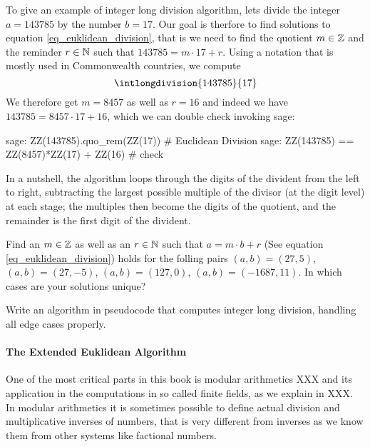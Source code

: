 \begin{example} To give an example of integer long division algorithm, lets divide the integer $a=143785$ by the number $b=17$. Our goal is therfore to find solutions to equation \ref{eq_euklidean_division}, that is we need to find the quotient $m\in\mathbb{Z}$ and the reminder $r \in \mathbb{N}$ such that $143785 = m\cdot 17 + r$. Using a notation that is mostly used in Commonwealth countries, we compute
\begin{equation}
\intlongdivision{143785}{17}
\end{equation}
We therefore get $m=8457$ as well as $r=16$ and indeed we have $143785 = 8457\cdot 17 + 16$, which we can double check invoking sage:
\begin{sagecommandline}
sage: ZZ(143785).quo_rem(ZZ(17)) # Euclidean Division
sage: ZZ(143785) == ZZ(8457)*ZZ(17) + ZZ(16) # check
\end{sagecommandline}
In a nutshell, the algorithm loops through the digits of the divident from the left to right, subtracting the largest possible multiple of the divisor (at the digit level) at each stage; the multiples then become the digits of the quotient, and the remainder is the first digit of the divident.
\end{example}
\begin{exercise}
Find an $m\in\mathbb{Z}$ as well as an $r\in\mathbb{N}$ such that $a= m\cdot b +r$ (See equation \ref{eq_euklidean_division}) holds for the folling pairs $(a,b) = (27,5)$, $(a,b)=(27,-5)$, $(a,b)=(127,0)$, $(a,b)= (-1687, 11)$. In which cases are your solutions unique?
\end{exercise}
\begin{exercise}
Write an algorithm in pseudocode that computes integer long division, handling all edge cases properly.
\end{exercise}

\paragraph{The Extended Euklidean Algorithm}
One of the most critical parts in this book is modular arithmetics XXX and its application in the computations in so called finite fields, as we explain in XXX. In modular arithmetics it is sometimes possible to define actual division and multiplicative inverses of numbers, that is very different from inverses as we know them from other systems like factional numbers. 

